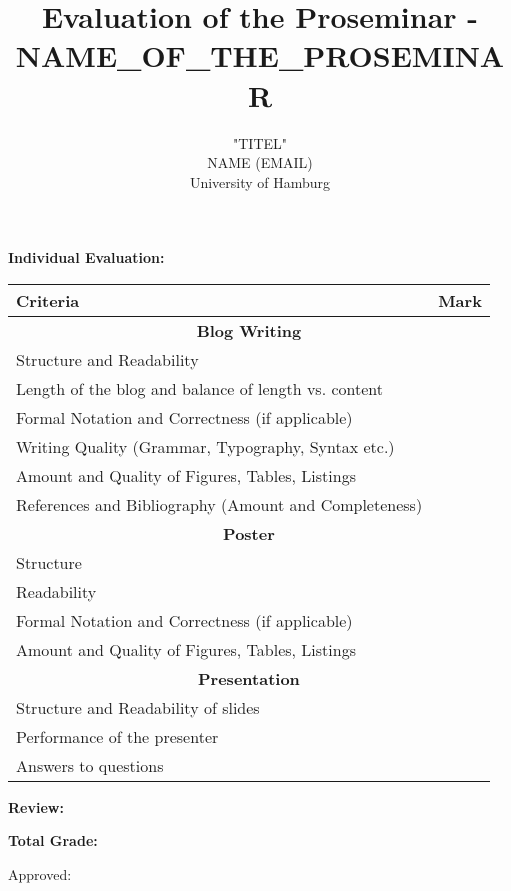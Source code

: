 \documentclass{scrartcl}
\title{Evaluation of the Proseminar -\\ NAME_OF_THE_PROSEMINAR}
\author{}
\subtitle{"TITEL" \\ NAME (EMAIL) \\ University of Hamburg}
\date{\vspace{-2cm}}
\begin{document}
\maketitle

\textbf{Individual Evaluation:}
\begin{table}[htb!]
\centering
\begin{tabular}{@{}ll@{}}
\toprule
\textbf{Criteria}                                      & \textbf{Mark} \\ \midrule
\multicolumn{2}{c}{\textbf{Blog Writing}}                \\
Structure and Readability                              & \\
Length of the blog and balance of length vs. content   & \\
Formal Notation and Correctness (if applicable)        & \\
Writing Quality (Grammar, Typography, Syntax etc.)     & \\
Amount and Quality of Figures, Tables, Listings        & \\
References and Bibliography (Amount and Completeness)  & \\
\multicolumn{2}{c}{\textbf{Poster}}                      \\
Structure                                              & \\
Readability                                            & \\
Formal Notation and Correctness (if applicable)        & \\
Amount and Quality of Figures, Tables, Listings        & \\
\multicolumn{2}{c}{\textbf{Presentation}}                \\
Structure and Readability of slides                    & \\
Performance of the presenter                           & \\
Answers to questions                                   & \\ \bottomrule
\end{tabular}
\end{table}%

\textbf{Review:} 
 

\vspace{0.5cm}
\textbf{Total Grade:} 

\vspace{0.5cm}
Approved: \hrulefill

\hspace*{0mm}\phantom{Approved: }  
\end{document}
